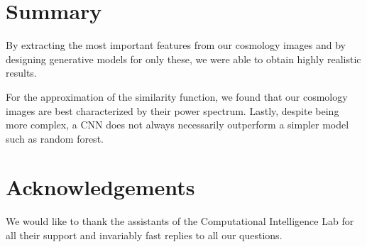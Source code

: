 \documentclass[10pt,conference,compsocconf]{IEEEtran}
\newcommand\TODO[1]{\textcolor{red}{#1}} %
\begin{document}

\section{Summary}

By extracting the most important features from our cosmology images and by designing generative models for only these, we were able to obtain highly realistic results.


For the approximation of the similarity function, we found that our cosmology images are best characterized by their power spectrum. Lastly, despite being more complex, a CNN does not always necessarily outperform a simpler model such as random forest. %


\section*{Acknowledgements}
We would like to thank the assistants of the Computational Intelligence Lab for all their support and invariably fast replies to all our questions.

\newpage





\clearpage




\end{document}
